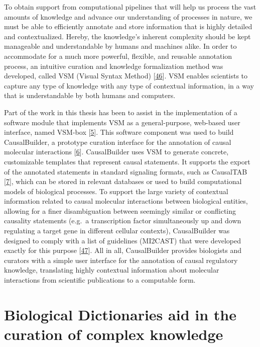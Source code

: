 \documentclass[
  12pt,
]{book}
\begin{document}
\newpage

To obtain support from computational pipelines that will help us process the vast amounts of knowledge and advance our understanding of processes in nature, we must be able to efficiently annotate and store information that is highly detailed and contextualized.
Hereby, the knowledge's inherent complexity should be kept manageable and understandable by humans and machines alike.
In order to accommodate for a much more powerful, flexible, and reusable annotation process, an intuitive curation and knowledge formalization method was developed, called VSM (Visual Syntax Method) {[}\protect\hyperlink{ref-vsm-paper}{46}{]}.
VSM enables scientists to capture any type of knowledge with any type of contextual information, in a way that is understandable by both humans and computers.

Part of the work in this thesis has been to assist in the implementation of a software module that implements VSM as a general-purpose, web-based user interface, named VSM-box {[}\protect\hyperlink{ref-vsm-box}{5}{]}.
This software component was used to build CausalBuilder, a prototype curation interface for the annotation of causal molecular interactions {[}\protect\hyperlink{ref-Toure2021}{6}{]}.
CausalBuilder uses VSM to generate concrete, customizable templates that represent causal statements.
It supports the export of the annotated statements in standard signaling formats, such as CausalTAB {[}\protect\hyperlink{ref-Perfetto2019}{7}{]}, which can be stored in relevant databases or used to build computational models of biological processes.
To support the large variety of contextual information related to causal molecular interactions between biological entities, allowing for a finer disambiguation between seemingly similar or conflicting causality statements (e.g.~a transcription factor simultaneously up and down regulating a target gene in different cellular contexts), CausalBuilder was designed to comply with a list of guidelines (MI2CAST) that were developed exactly for this purpose {[}\protect\hyperlink{ref-Toure2020}{47}{]}.
All in all, CausalBuilder provides biologists and curators with a simple user interface for the annotation of causal regulatory knowledge, translating highly contextual information about molecular interactions from scientific publications to a computable form.

\newpage

\hypertarget{biological-dictionaries-aid-in-the-curation-of-complex-knowledge}{%
\section*{Biological Dictionaries aid in the curation of complex knowledge}\label{biological-dictionaries-aid-in-the-curation-of-complex-knowledge}}
\end{document}
